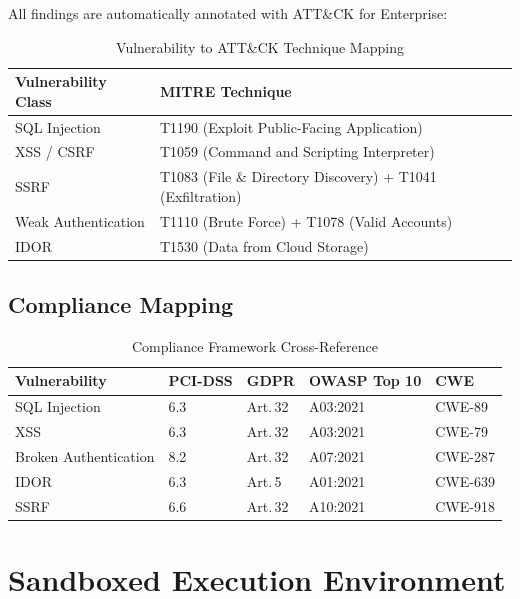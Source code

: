 \documentclass[12pt,a4paper]{article}
\begin{document}
All findings are automatically annotated with ATT\&CK for Enterprise:

\begin{table}[H]
\centering
\caption{Vulnerability to ATT\&CK Technique Mapping}
\begin{tabular}{ll}
\toprule
\textbf{Vulnerability Class} & \textbf{MITRE Technique} \\
\midrule
SQL Injection & T1190 (Exploit Public-Facing Application) \\
XSS / CSRF & T1059 (Command and Scripting Interpreter) \\
SSRF & T1083 (File \& Directory Discovery) + T1041 (Exfiltration) \\
Weak Authentication & T1110 (Brute Force) + T1078 (Valid Accounts) \\
IDOR & T1530 (Data from Cloud Storage) \\
\bottomrule
\end{tabular}
\end{table}

\subsection{Compliance Mapping}

\begin{table}[H]
\centering
\caption{Compliance Framework Cross-Reference}
\begin{tabular}{lllll}
\toprule
\textbf{Vulnerability} & \textbf{PCI-DSS} & \textbf{GDPR} & \textbf{OWASP Top 10} & \textbf{CWE} \\
\midrule
SQL Injection & 6.3 & Art.\,32 & A03:2021 & CWE-89 \\
XSS & 6.3 & Art.\,32 & A03:2021 & CWE-79 \\
Broken Authentication & 8.2 & Art.\,32 & A07:2021 & CWE-287 \\
IDOR & 6.3 & Art.\,5 & A01:2021 & CWE-639 \\
SSRF & 6.6 & Art.\,32 & A10:2021 & CWE-918 \\
\bottomrule
\end{tabular}
\end{table}



\section{Sandboxed Execution Environment}
\end{document}
